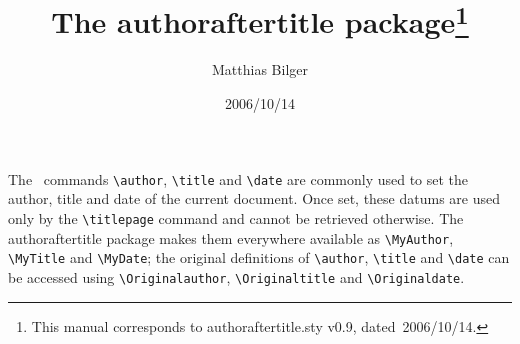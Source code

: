 \documentclass[pagesize=auto]{scrartcl}
\title{The \textsf{authoraftertitle} package\thanks{This manual corresponds to \textsf{authoraftertitle.sty} v0.9, dated~2006/10/14.}}
\author{Matthias Bilger}
\date{2006/10/14}
\begin{document}
\maketitle

\noindent
The \LaTeXe\ commands \verb+\author+, \verb+\title+ and \verb+\date+ are commonly used to set the author, title and date of the current document.
Once set, these datums are used only by the \verb+\titlepage+ command and cannot be retrieved otherwise. The \textsf{authoraftertitle} package makes them everywhere available as \verb+\MyAuthor+, \verb+\MyTitle+ and \verb+\MyDate+; the original definitions of \verb+\author+, \verb+\title+ and \verb+\date+ can be accessed using \verb+\Originalauthor+, \verb+\Originaltitle+ and \verb+\Originaldate+.
\end{document}

